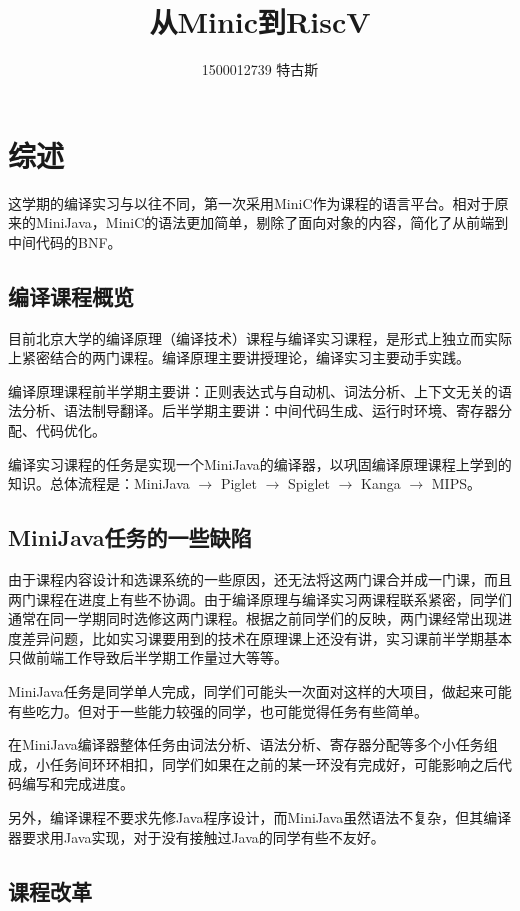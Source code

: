 \documentclass{ctexart}
\title{从Minic到RiscV \\ \large编译实习课程报告}
\author{1500012739 特古斯}
\begin{document}
\maketitle{}
\tableofcontents
\newpage

\section{综述}

这学期的编译实习与以往不同，第一次采用MiniC作为课程的语言平台。相对于原来的MiniJava，MiniC的语法更加简单，剔除了面向对象的内容，简化了从前端到中间代码的BNF。
\subsection{编译课程概览}

目前北京大学的编译原理（编译技术）课程与编译实习课程，是形式上独立而实际上紧密结合的两门课程。编译原理主要讲授理论，编译实习主要动手实践。

编译原理课程前半学期主要讲：正则表达式与自动机、词法分析、上下文无关的语法分析、语法制导翻译。后半学期主要讲：中间代码生成、运行时环境、寄存器分配、代码优化。

编译实习课程的任务是实现一个MiniJava的编译器，以巩固编译原理课程上学到的知识。总体流程是：MiniJava $\rightarrow$ Piglet $\rightarrow$ Spiglet $\rightarrow$ Kanga $\rightarrow$ MIPS。

\subsection{MiniJava任务的一些缺陷}

由于课程内容设计和选课系统的一些原因，还无法将这两门课合并成一门课，而且两门课程在进度上有些不协调。由于编译原理与编译实习两课程联系紧密，同学们通常在同一学期同时选修这两门课程。根据之前同学们的反映，两门课经常出现进度差异问题，比如实习课要用到的技术在原理课上还没有讲，实习课前半学期基本只做前端工作导致后半学期工作量过大等等。

MiniJava任务是同学单人完成，同学们可能头一次面对这样的大项目，做起来可能有些吃力。但对于一些能力较强的同学，也可能觉得任务有些简单。

在MiniJava编译器整体任务由词法分析、语法分析、寄存器分配等多个小任务组成，小任务间环环相扣，同学们如果在之前的某一环没有完成好，可能影响之后代码编写和完成进度。

另外，编译课程不要求先修Java程序设计，而MiniJava虽然语法不复杂，但其编译器要求用Java实现，对于没有接触过Java的同学有些不友好。

\subsection{课程改革}
\end{document}

